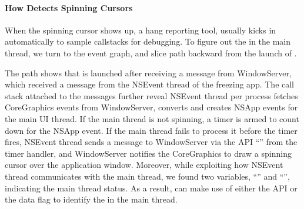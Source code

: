 
\paragraph{How \xxx Detects Spinning Cursors}
When the spinning cursor shows up, a hang reporting tool, \spindump usually
kicks in automatically to sample callstacks for debugging. To figure out the
\spinningnode in the main thread, we turn to the event graph, and slice path
backward from the launch of \spindump.

The path shows that \spindump is launched after receiving a message from
WindowServer, which received a message from the NSEvent thread of the freezing
app. The call stack attached to the messages further reveal NSEvent thread per
process fetches CoreGraphics events from WindowServer, converts and creates
NSApp events for the main UI thread. If the main thread is not spinning, a timer
is armed to count down for the NSApp event. If the main thread fails to process
it before the timer fires, NSEvent thread sends a message to WindowServer
via the API ``'' from the timer handler, and
WindowServer notifies the CoreGraphics to draw a spinning cursor over the
application window. Moreover, while exploiting how NSEvent thread communicates
with the main thread, we found two variables, ``''
and ``'', indicating the main thread status. As a
result, \xxx can make use of either the API or the data flag to identify the
\spinningnode in the main thread.

